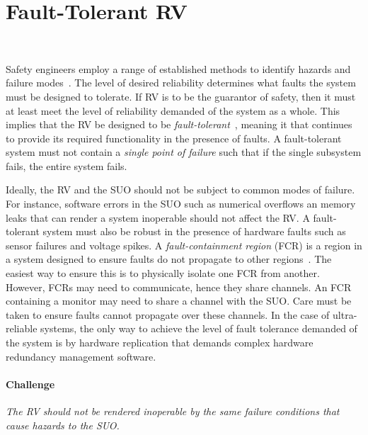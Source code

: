 \section{Fault-Tolerant RV}~\label{sec:ft}

 
Safety engineers employ a range of established methods to identify
hazards and failure modes~\cite{Levenson}.  The level of desired
reliability determines what faults the system must be designed to
tolerate. If RV is to be the guarantor of safety, then it must at
least meet the level of reliability demanded of the system as a whole.
This implies that the RV be designed to be
\emph{fault-tolerant}~\cite{butler-faults}, meaning it that continues
to provide its required functionality in the presence of faults.  A
fault-tolerant system must not contain a \emph{single point of
  failure} such that if the single subsystem fails, the entire system
fails.

 Ideally, the RV and the SUO should not be subject to common
 modes of failure.  For instance, software errors in the SUO such as
 numerical overflows an memory leaks that can render a system
 inoperable should not affect the RV.  A fault-tolerant system must
 also be robust in the presence of hardware faults such as sensor failures
 and voltage spikes.  A \emph{fault-containment region} (FCR)
 is a region in a system designed to ensure faults do not propagate to
 other regions~\cite{Rushby01:buscompare}.   The 
 easiest way to ensure this is to physically isolate one FCR from
 another.  However, FCRs may need to communicate, hence they share
 channels. An FCR containing a monitor may need to share a channel
 with the SUO.  Care must be taken to ensure faults cannot propagate
 over these channels. In the case of ultra-reliable systems, the only
 way to achieve the level of fault tolerance demanded of the system is
 by hardware replication that demands complex hardware redundancy
 management software. 


\paragraph{Challenge}   \emph{The RV  should not be rendered inoperable by the
 same failure conditions that cause hazards to the SUO.}


